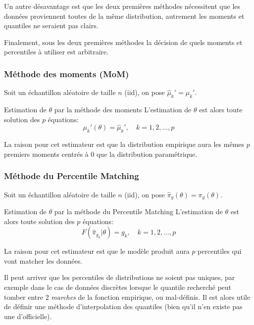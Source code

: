\documentclass[10pt, french]{article}
\begin{document}
\begin{multicols*}{2}
Un autre désavantage est que les deux premières méthodes nécessitent que les données proviennent toutes de la même distribution, autrement les moments et quantiles ne seraient pas clairs.

Finalement, sous les deux premières méthodes la décision de quels moments et percentiles à utiliser est arbitraire.

\subsubsection*{Méthode des moments (MoM)}

Soit un échantillon aléatoire de taille $n$ (iid), on pose $\hat\mu_{k}' = \mu_{k}'$.
\begin{algo}{Estimation de $\theta$ par la méthode des moments}
L'estimation de $\theta$ est alors toute solution des $p$ équations:
\begin{equation*}
	\mu_{k}'(\theta) = \hat\mu_{k}', \quad	k = 1, 2, \dots, p
\end{equation*}
\end{algo}

La raison pour cet estimateur est que la distribution empirique aura les mêmes $p$ premiers moments centrés à 0 que la distribution paramétrique.

\subsubsection*{Méthode du \guillemotleft Percentile Matching \guillemotright}

Soit un échantillon aléatoire de taille $n$ (iid), on pose $\hat\pi_{g}(\theta) = \pi_{g}(\theta)$.

\begin{algo}{Estimation de $\theta$ par la méthode du \guillemotleft Percentile Matching \guillemotright}
L'estimation de $\theta$ est alors toute solution des $p$ équations:
\begin{equation*}
	F(\hat\pi_{g_{k}} | \theta)	=	g_{k}, \quad	k = 1, 2, \dots, p
\end{equation*}
\end{algo}

La raison pour cet estimateur est que le modèle produit aura $p$ percentiles qui vont \guillemotleft matcher \guillemotright les données.

Il peut arriver que les percentiles de distributions ne soient pas uniques, par exemple dans le cas de données discrètes lorsque le quantile recherché peut tomber entre 2 \emph{marches} de la fonction empirique, ou mal-définis.
Il est alors utile de définir une méthode d'interpolation des quantiles (bien qu'il n'en existe pas une d'officielle).


\end{multicols*}
\end{document}
